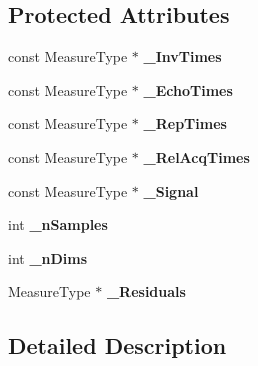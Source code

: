 \subsection*{Protected Attributes}
\begin{DoxyCompactItemize}
\item 
\hypertarget{class_ox_1_1_model_a20eb4db9cd1fa1cd0fa4b46e06e08d9c}{const Measure\-Type $\ast$ {\bfseries \-\_\-\-Inv\-Times}}\label{class_ox_1_1_model_a20eb4db9cd1fa1cd0fa4b46e06e08d9c}

\item 
\hypertarget{class_ox_1_1_model_a7b00c7d8554d101dfdf86b2013200983}{const Measure\-Type $\ast$ {\bfseries \-\_\-\-Echo\-Times}}\label{class_ox_1_1_model_a7b00c7d8554d101dfdf86b2013200983}

\item 
\hypertarget{class_ox_1_1_model_af2c4ac111d41ce5b6d5ca9f66ad36918}{const Measure\-Type $\ast$ {\bfseries \-\_\-\-Rep\-Times}}\label{class_ox_1_1_model_af2c4ac111d41ce5b6d5ca9f66ad36918}

\item 
\hypertarget{class_ox_1_1_model_a093e159893a4ebf36452e470cda9a4d1}{const Measure\-Type $\ast$ {\bfseries \-\_\-\-Rel\-Acq\-Times}}\label{class_ox_1_1_model_a093e159893a4ebf36452e470cda9a4d1}

\item 
\hypertarget{class_ox_1_1_model_a810156ed7ea865fa0980e6b05128a80c}{const Measure\-Type $\ast$ {\bfseries \-\_\-\-Signal}}\label{class_ox_1_1_model_a810156ed7ea865fa0980e6b05128a80c}

\item 
\hypertarget{class_ox_1_1_model_a1eb1604ca7c4587d4cb66ccc1d068adc}{int {\bfseries \-\_\-n\-Samples}}\label{class_ox_1_1_model_a1eb1604ca7c4587d4cb66ccc1d068adc}

\item 
\hypertarget{class_ox_1_1_model_ae7c67e12cb601aafcce580b008d918cd}{int {\bfseries \-\_\-n\-Dims}}\label{class_ox_1_1_model_ae7c67e12cb601aafcce580b008d918cd}

\item 
\hypertarget{class_ox_1_1_model_a4f95dba7c1751745f8087e6cb98ba486}{Measure\-Type $\ast$ {\bfseries \-\_\-\-Residuals}}\label{class_ox_1_1_model_a4f95dba7c1751745f8087e6cb98ba486}

\end{DoxyCompactItemize}


\subsection{Detailed Description}
